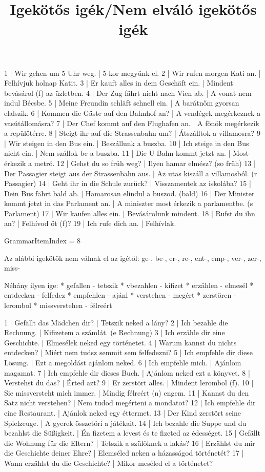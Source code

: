 \begin{exmp}
1 | Wir gehen um 5 Uhr weg. | 5-kor megyünk el.
2 | Wir rufen morgen Kati an. | Felhívjuk holnap Katit.
3 | Er kauft alles in dem Geschäft ein. | Mindent bevásárol (f) az üzletben.
4 | Der Zug fährt nicht nach Vien ab. | A vonat nem indul Bécsbe.
5 | Meine Freundin schläft schnell ein. | A barátnőm gyorsan elalszik.
6 | Kommen die Gäste auf den Bahnhof an? | A vendégek megérkeznek a vasútállomásra?
7 | Der Chef kommt auf den Flughafen an. | A főnök megérkezik a repülőtérre.
8 | Steigt ihr auf die Strassenbahn um? | Átszálltok a villamosra?
9 | Wir steigen in den Bus ein. | Beszállunk a buszba.
10 | Ich steige in den Bus nicht ein. | Nem szállok be a buszba.
11 | Die U-Bahn kommt jetzt an. | Most érkezik a metró.
12 | Gehst du so früh weg? | Ilyen hamar elmész? (so früh)
13 | Der Passagier steigt aus der Strassenbahn aus. | Az utas kiszáll a villamosból. (r Passagier)
14 | Geht ihr in die Schule zurück? | Visszamentek az iskolába?
15 | Dein Bus fährt bald ab. | Hamarosan elindul a buszod. (bald)
16 | Der Minister kommt jetzt in das Parlament an. | A miniszter most érkezik a parlamentbe. (s Parlament)
17 | Wir kaufen alles ein. | Bevásárolunk mindent.
18 | Rufst du ihn an? | Felhívod őt (f)?
19 | Ich rufe dich an. | Felhívlak.
\end{exmp}

\title{Igekötős igék/Nem elváló igekötős igék}

GrammarItemIndex = 8

\begin{desc}
Az alábbi igekötők nem válnak el az igétől:
ge-, be-, er-, re-, ent-, emp-, ver-, zer-, miss-

Néhány ilyen ige:
* gefallen - tetszik
* vbezahlen - kifizet
* erzählen - elmesél
* entdecken - felfedez
* empfehlen - ajánl
* verstehen - megért
* zerstören - lerombol
* missverstehen - félreért
\end{desc}

\begin{exmp}
1 | Gefällt das Mädchen dir? | Tetszik neked a lány?
2 | Ich bezahle die Rechnung. | Kifizetem a számlát. (e Rechnung)
3 | Ich erzähle dir eine Geschichte. | Elmesélek neked egy történetet.
4 | Warum kannst du nichts entdecken? | Miért nem tudsz semmit sem felfedezni?
5 | Ich empfehle dir diese Lösung. | Ezt a megoldást ajánlom neked.
6 | Ich empfehle mich. | Ajánlom magamat.
7 | Ich empfehle dir dieses Buch. | Ajánlom neked ezt a könyvet.
8 | Verstehst du das? | Érted azt?
9 | Er zerstört alles. | Mindent lerombol (f).
10 | Sie missversteht mich immer. | Mindig félreért (n) engem.
11 | Kannst du den Satz nicht verstehen? | Nem tudod megérteni a mondatot?
12 | Ich empfehle dir eine Restaurant. | Ajánlok neked egy éttermet.
13 | Der Kind zerstört seine Spielzeuge. | A gyerek összetöri a játékait.
14 | Ich bezahle die Suppe und du bezahlst die Süßigkeit. | Én fizetem a levest és te fizeted az édességet.
15 | Gefällt die Wohnung für die Eltern? | Tetszik a szülőknek a lakás?
16 | Erzählst du mir die Geschichte deiner Ehre? | Elemséled neken a házasságod történetét?
17 | Wann erzählst du die Geschichte? | Mikor meséled el a történetet?
\end{exmp}

